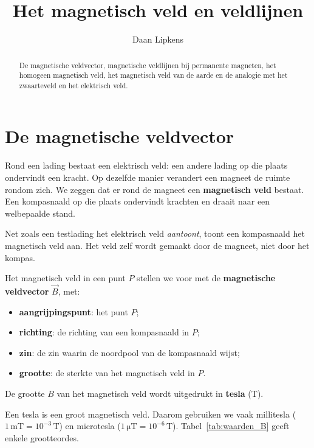 \documentclass{ximera}
\title{Het magnetisch veld en veldlijnen}
\author{Daan Lipkens}
\begin{document}
\begin{abstract}
    De magnetische veldvector, magnetische veldlijnen bij permanente magneten, het homogeen magnetisch veld, het magnetisch veld van de aarde en de analogie met het zwaarteveld en het elektrisch veld.
\end{abstract}
\maketitle
\label{ond:magnetisme_veld}

\section{De magnetische veldvector}\label{sec:magnetisch-veld}
Rond een lading bestaat een elektrisch veld: een andere lading op die plaats ondervindt een kracht. Op dezelfde manier verandert een magneet de ruimte rondom zich. We zeggen dat er rond de magneet een \textbf{magnetisch veld} bestaat. Een kompasnaald op die plaats ondervindt krachten en draait naar een welbepaalde stand.

Net zoals een testlading het elektrisch veld \emph{aantoont}, toont een kompasnaald het magnetisch veld aan. Het veld zelf wordt gemaakt door de magneet, niet door het kompas.

\begin{definition}[foldable=true,title={Magnetische veldvector}]\nl
    Het magnetisch veld in een punt $P$ stellen we voor met de \textbf{magnetische veldvector} $\vec{B}$, met:
    \begin{itemize}
        \item \textbf{aangrijpingspunt}: het punt $P$;
        \item \textbf{richting}: de richting van een kompasnaald in $P$;
        \item \textbf{zin}: de zin waarin de noordpool van de kompasnaald wijst;
        \item \textbf{grootte}: de sterkte van het magnetisch veld in $P$.
    \end{itemize}
    De grootte $B$ van het magnetisch veld wordt uitgedrukt in \textbf{tesla} (T).
\end{definition}

Een tesla is een groot magnetisch veld. Daarom gebruiken we vaak millitesla ($1\,\mathrm{mT} = 10^{-3}\,\mathrm{T}$) en microtesla ($1\,\mathrm{\mu T} = 10^{-6}\,\mathrm{T}$). Tabel~\ref{tab:waarden_B} geeft enkele grootteordes.
\end{document}
